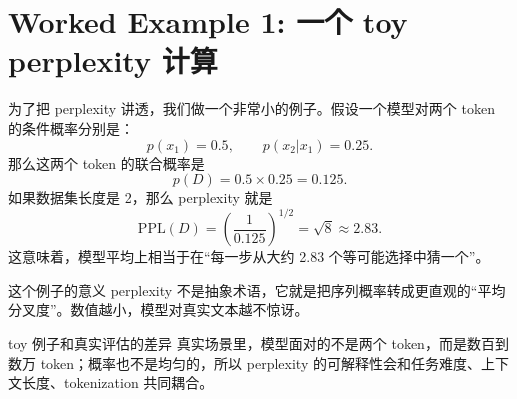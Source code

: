 \section{Worked Example 1: 一个 toy perplexity 计算}

为了把 perplexity 讲透，我们做一个非常小的例子。假设一个模型对两个 token 的条件概率分别是：
\[
p(x_1)=0.5,\qquad p(x_2|x_1)=0.25.
\]
那么这两个 token 的联合概率是
\[
p(D)=0.5\times 0.25=0.125.
\]
如果数据集长度是 2，那么 perplexity 就是
\[
\mathrm{PPL}(D)=\left(\frac{1}{0.125}\right)^{1/2}=\sqrt{8}\approx 2.83.
\]
这意味着，模型平均上相当于在“每一步从大约 2.83 个等可能选择中猜一个”。

\begin{knowledgebox}{这个例子的意义}
perplexity 不是抽象术语，它就是把序列概率转成更直观的“平均分叉度”。数值越小，模型对真实文本越不惊讶。
\end{knowledgebox}

\begin{warningbox}{toy 例子和真实评估的差异}
真实场景里，模型面对的不是两个 token，而是数百到数万 token；概率也不是均匀的，所以 perplexity 的可解释性会和任务难度、上下文长度、tokenization 共同耦合。
\end{warningbox}


